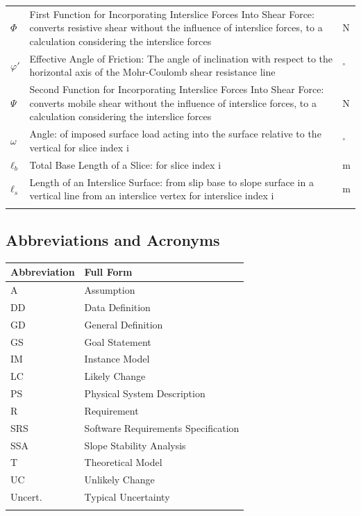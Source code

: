 \documentclass[12pt]{article}
\begin{document}
\begin{longtabu}{l X[l] l}
$Φ$ & First Function for Incorporating Interslice Forces Into Shear Force: converts resistive shear without the influence of interslice forces, to a calculation considering the interslice forces & N
\\
$φ'$ & Effective Angle of Friction: The angle of inclination with respect to the horizontal axis of the Mohr-Coulomb shear resistance line & ${}^{\circ}$
\\
$Ψ$ & Second Function for Incorporating Interslice Forces Into Shear Force: converts mobile shear without the influence of interslice forces, to a calculation considering the interslice forces & N
\\
$ω$ & Angle: of imposed surface load acting into the surface relative to the vertical for slice index i & ${}^{\circ}$
\\
${ℓ_{b}}$ & Total Base Length of a Slice: for slice index i & m
\\
${ℓ_{s}}$ & Length of an Interslice Surface: from slip base to slope surface in a vertical line from an interslice vertex for interslice index i & m
\\
\bottomrule
\label{Table:ToS}
\end{longtabu}
\subsection{Abbreviations and Acronyms}
\label{Sec:TAbbAcc}
\begin{longtable*}{l l}
\toprule
Abbreviation & Full Form
\\
\midrule
A & Assumption
\\
DD & Data Definition
\\
GD & General Definition
\\
GS & Goal Statement
\\
IM & Instance Model
\\
LC & Likely Change
\\
PS & Physical System Description
\\
R & Requirement
\\
SRS & Software Requirements Specification
\\
SSA & Slope Stability Analysis
\\
T & Theoretical Model
\\
UC & Unlikely Change
\\
Uncert. & Typical Uncertainty
\\
\bottomrule
\label{Table:TAbbAcc}
\end{longtable*}
\end{document}
